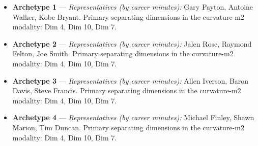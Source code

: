 \begin{itemize}
\item \textbf{Archetype 1} --- \emph{Representatives (by career minutes):} Gary Payton, Antoine Walker, Kobe Bryant. Primary separating dimensions in the curvature-m2 modality: Dim 4, Dim 10, Dim 7.
\item \textbf{Archetype 2} --- \emph{Representatives (by career minutes):} Jalen Rose, Raymond Felton, Joe Smith. Primary separating dimensions in the curvature-m2 modality: Dim 4, Dim 10, Dim 7.
\item \textbf{Archetype 3} --- \emph{Representatives (by career minutes):} Allen Iverson, Baron Davis, Steve Francis. Primary separating dimensions in the curvature-m2 modality: Dim 4, Dim 10, Dim 7.
\item \textbf{Archetype 4} --- \emph{Representatives (by career minutes):} Michael Finley, Shawn Marion, Tim Duncan. Primary separating dimensions in the curvature-m2 modality: Dim 4, Dim 10, Dim 7.
\end{itemize}
